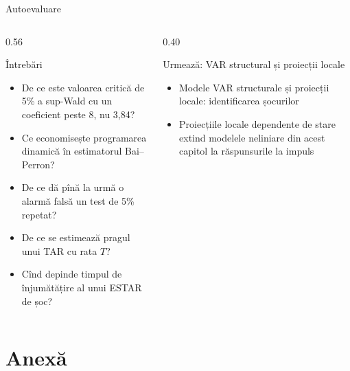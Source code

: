 \begin{frame}{Autoevaluare}
\itemsize{\small}
\begin{columns}[T]
\begin{column}{0.56\textwidth}
\begin{block}{Întrebări}
\begin{itemize}
    \item De ce este valoarea critică de 5\% a sup-Wald cu un coeficient peste 8, nu 3,84?
    \item Ce economisește programarea dinamică în estimatorul Bai--Perron?
    \item De ce dă pînă la urmă o alarmă falsă un test de 5\% repetat?
    \item De ce se estimează pragul unui TAR cu rata $T$?
    \item Cînd depinde timpul de înjumătățire al unui ESTAR de șoc?
\end{itemize}
\end{block}
\end{column}
\begin{column}{0.40\textwidth}
\begin{block}{Urmează: VAR structural și proiecții locale}
\begin{itemize}
    \item Modele VAR structurale și proiecții locale: identificarea șocurilor
    \item Proiecțiile locale dependente de stare extind modelele neliniare din acest capitol la răspunsurile la impuls
\end{itemize}
\end{block}
\end{column}
\end{columns}
\end{frame}


\section{Anexă}

